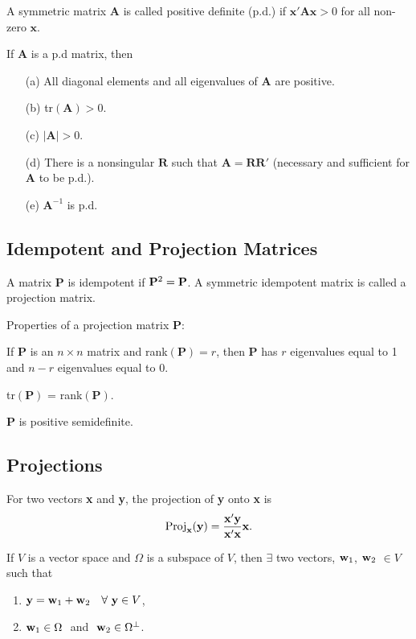 \newpage
\bdefi 
A symmetric matrix $\mathbf A$ is called positive definite (p.d.) if
$\mathbf{x'Ax} > 0$ for all non-zero $\mathbf x$.
\edefi



\bstheo
If  $\mathbf A$ is a p.d matrix, then
\begin{itemize}
\item[(a)] All diagonal elements and all eigenvalues of $\mathbf A$ are positive.
\item[(b)] tr$(\mathbf{A})> 0$.
\item[(c)] $|\mathbf{A}|>0$.
\item[(d)] There is a nonsingular $\mathbf R$ such that $\mathbf{A=RR'}$
(necessary and sufficient for $\mathbf A$ to be p.d.).
\item[(e)] $\mathbf{A}^{-1}$ is p.d.
\end{itemize}
\etheo


\subsection{Idempotent and Projection Matrices}

\bdefi
A matrix $\mathbf P$ is idempotent if $\mathbf P^2={\bf P}$.  A
symmetric idempotent matrix is called a projection matrix.
\edefi

Properties of a projection matrix $\mathbf P$:

\bstheo
If $\mathbf P$ is an $n\times n$ matrix and rank$(\mathbf{P})=r$, then
$\mathbf P$ has $r$ eigenvalues equal to 1 and $n-r$ eigenvalues equal
to 0.
\estheo

\bstheo
tr$(\mathbf P)$ = rank$(\mathbf P)$.
\estheo

\bstheo
$\mathbf P$ is positive semidefinite.
\etheo


\subsection{Projections}

\bdefi
For two vectors {\bf x} and {\bf y}, the projection of {\bf y} onto
{\bf x} is
$$ {\rm Proj}_{\bf x}({\bf y}) = {{\bf x}'{\bf y}\over {\bf x}'{\bf
x}} {\bf x}.
$$
\edefi

\bstheo
If $V$ is a vector space and $\Omega$ is a subspace of $V$, then
$\exists$ two vectors, ${\bf w}_1$, ${\bf w}_2$ $\in V$ such that
\begin{enumerate}
\item ${\bf y}= {\bf w}_1 + {\bf w}_2 \quad \forall \ {\bf y}\in V$,
\item ${\bf w}_1 \in \Omega\ $ and $\ {\bf w}_2 \in \Omega^{\perp}$.
\end{enumerate}
\estheo

